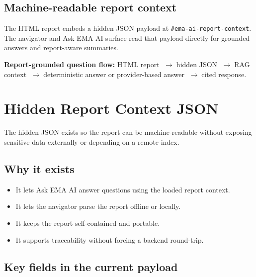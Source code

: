\documentclass[10pt,letterpaper]{article}
\newcommand{\strong}[1]{\textbf{\textcolor{emaNavy}{#1}}}
\newcommand{\code}[1]{\texttt{#1}}
\newcommand{\flowarrow}{\ensuremath{\;\boldsymbol{\rightarrow}\;}}
\begin{document}
\subsection{Machine-readable report context}

The HTML report embeds a hidden JSON payload at \code{\#ema-ai-report-context}. The navigator and Ask EMA AI surface read that payload directly for grounded answers and report-aware summaries.

\begin{tcolorbox}[colback=emaSoft]
\strong{Report-grounded question flow:} HTML report \flowarrow hidden JSON \flowarrow RAG context \flowarrow deterministic answer or provider-based answer \flowarrow cited response.
\end{tcolorbox}

\section{Hidden Report Context JSON}

The hidden JSON exists so the report can be machine-readable without exposing sensitive data externally or depending on a remote index.

\subsection{Why it exists}

\begin{itemize}
  \item It lets Ask EMA AI answer questions using the loaded report context.
  \item It lets the navigator parse the report offline or locally.
  \item It keeps the report self-contained and portable.
  \item It supports traceability without forcing a backend round-trip.
\end{itemize}

\subsection{Key fields in the current payload}
\end{document}
